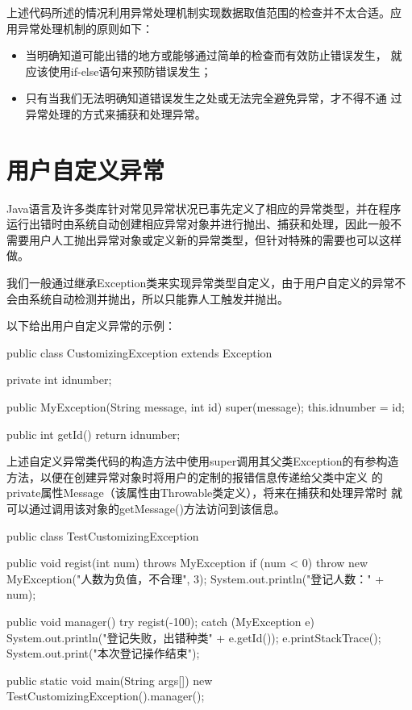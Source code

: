上述代码所述的情况利用异常处理机制实现数据取值范围的检查并不太合适。应
用异常处理机制的原则如下：

\begin{itemize}
\item 当明确知道可能出错的地方或能够通过简单的检查而有效防止错误发生，
  就应该使用if-else语句来预防错误发生；
\item 只有当我们无法明确知道错误发生之处或无法完全避免异常，才不得不通
  过异常处理的方式来捕获和处理异常。
\end{itemize}


\section{用户自定义异常}

Java语言及许多类库针对常见异常状况已事先定义了相应的异常类型，并在程序
运行出错时由系统自动创建相应异常对象并进行抛出、捕获和处理，因此一般不
需要用户人工抛出异常对象或定义新的异常类型，但针对特殊的需要也可以这样
做。

我们一般通过继承Exception类来实现异常类型自定义，由于用户自定义的异常不
会由系统自动检测并抛出，所以只能靠人工触发并抛出。

以下给出用户自定义异常的示例：


\begin{javaCode}
public class CustomizingException extends Exception {
  private int idnumber;

  public MyException(String message, int id) {
    super(message);
    this.idnumber = id;
  }

  public int getId() {
    return idnumber;
  }
}
\end{javaCode} 

上述自定义异常类代码的构造方法中使用super调用其父类Exception的有参构造
方法，以便在创建异常对象时将用户的定制的报错信息传递给父类中定义
的private属性Message（该属性由Throwable类定义），将来在捕获和处理异常时
就可以通过调用该对象的getMessage()方法访问到该信息。


\begin{javaCode}
public class TestCustomizingException {
  public void regist(int num) throws MyException {
    if (num < 0) {
      throw new MyException("人数为负值，不合理", 3);
    }
    System.out.println("登记人数：" + num);
  }

  public void manager() {
    try {
      regist(-100);
    } catch (MyException e) {
      System.out.println("登记失败，出错种类" + e.getId());
      e.printStackTrace();
    }
    System.out.print("本次登记操作结束");
  }

  public static void main(String args[]) {
    new TestCustomizingException().manager();
  }
}
\end{javaCode}

